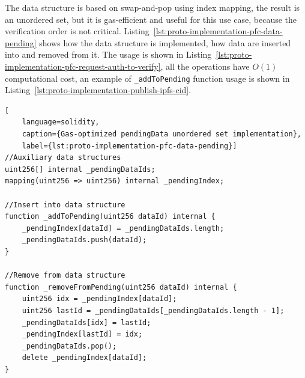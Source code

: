 The data structure is based on swap-and-pop using index mapping, the result is an unordered set, but it is gas-efficient and useful for this use case, because the verification order is not critical.
Listing~\ref{lst:proto-implementation-pfc-data-pending} shows how the data structure is implemented, how data are inserted into and removed from it.
The usage is shown in Listing~\ref{lst:proto-implementation-pfc-request-auth-to-verify}, all the operations have $O(1)$ computational cost, an example of \lstinline{_addToPending} function usage is shown in Listing~\ref{lst:proto-implementation-publish-ipfs-cid}.

\begin{lstlisting}[
    language=solidity,
    caption={Gas-optimized pendingData unordered set implementation},
    label={lst:proto-implementation-pfc-data-pending}]
//Auxiliary data structures
uint256[] internal _pendingDataIds;
mapping(uint256 => uint256) internal _pendingIndex;

//Insert into data structure
function _addToPending(uint256 dataId) internal {
    _pendingIndex[dataId] = _pendingDataIds.length;
    _pendingDataIds.push(dataId);
}

//Remove from data structure
function _removeFromPending(uint256 dataId) internal {
    uint256 idx = _pendingIndex[dataId];
    uint256 lastId = _pendingDataIds[_pendingDataIds.length - 1];
    _pendingDataIds[idx] = lastId;
    _pendingIndex[lastId] = idx;
    _pendingDataIds.pop();
    delete _pendingIndex[dataId];
}
\end{lstlisting}